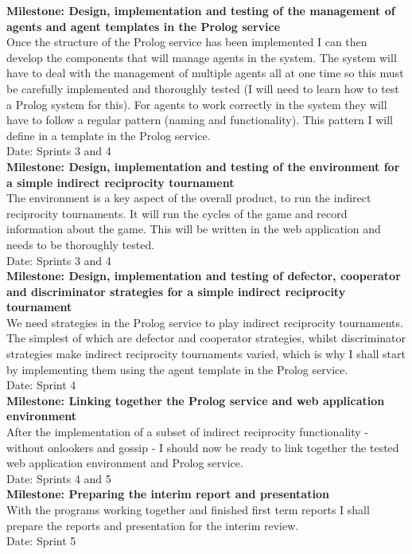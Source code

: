 \documentclass{article}
\begin{document}
\noindent\textbf{Milestone: Design, implementation and testing of the management of agents and agent templates in the Prolog service}\\
Once the structure of the Prolog service has been implemented I can then develop the components that will manage agents in the system. The system will have to deal with the management of multiple agents all at one time so this must be carefully implemented and thoroughly tested (I will need to learn how to test a Prolog system for this). For agents to work correctly in the system they will have to follow a regular pattern (naming and functionality). This pattern I will define in a template in the Prolog service.\\
Date: Sprints 3 and 4\\

\noindent\textbf{Milestone: Design, implementation and testing of the environment for a simple indirect reciprocity tournament}\\
The environment is a key aspect of the overall product, to run the indirect reciprocity tournaments. It will run the cycles of the game and record information about the game. This will be written in the web application and needs to be thoroughly tested.\\
Date: Sprints 3 and 4\\

\noindent\textbf{Milestone: Design, implementation and testing of defector, cooperator and discriminator strategies for a simple indirect reciprocity tournament}\\
We need strategies in the Prolog service to play indirect reciprocity tournaments. The simplest of which are defector and cooperator strategies, whilst discriminator strategies make indirect reciprocity tournaments varied, which is why I shall start by implementing them using the agent template in the Prolog service.\\
Date: Sprint 4\\

\noindent\textbf{Milestone: Linking together the Prolog service and web application environment}\\
After the implementation of a subset of indirect reciprocity functionality - without onlookers and gossip - I should now be ready to link together the tested web application environment and Prolog service.\\
Date: Sprints 4 and 5\\

\noindent\textbf{Milestone: Preparing the interim report and presentation}\\
With the programs working together and finished first term reports I shall prepare the reports and presentation for the interim review.\\
Date: Sprint 5\\
\end{document}
